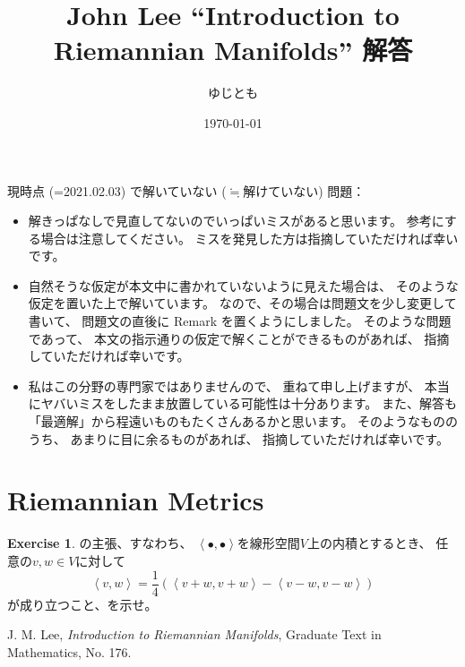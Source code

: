 \documentclass[uplatex,dvipdfmx]{jsarticle}
\title{John Lee ``Introduction to Riemannian Manifolds'' 解答}
\author{ゆじとも}
\date{\today}
\theoremstyle{definition}
\newtheorem{Ex}[Ex]{Exercise}
\begin{document}
\maketitle
\setcounter{subsection}{-1}


現時点 (=2021.02.03) で解いていない (\(\fallingdotseq\)解けていない) 問題：

\begin{itemize}
  \item
  解きっぱなしで見直してないのでいっぱいミスがあると思います。
  参考にする場合は注意してください。
  ミスを発見した方は指摘していただければ幸いです。
  \item
  自然そうな仮定が本文中に書かれていないように見えた場合は、
  そのような仮定を置いた上で解いています。
  なので、その場合は問題文を少し変更して書いて、
  問題文の直後に Remark を置くようにしました。
  そのような問題であって、
  本文の指示通りの仮定で解くことができるものがあれば、
  指摘していただければ幸いです。
  \item
  私はこの分野の専門家ではありませんので、
  重ねて申し上げますが、
  本当にヤバいミスをしたまま放置している可能性は十分あります。
  また、解答も「最適解」から程遠いものもたくさんあるかと思います。
  そのようなもののうち、
  あまりに目に余るものがあれば、
  指摘していただければ幸いです。
\end{itemize}

\newpage
\section{Riemannian Metrics}


\setcounter{Ex}{1}
\begin{Ex}\label{Ex: 2.2}
  \cite[Lemma 2.1]{JL}の主張、すなわち、
  \(\left<\bullet,\bullet\right>\)を線形空間\(V\)上の内積とするとき、
  任意の\(v,w\in V\)に対して
  \[
  \left< v,w \right> = \frac{1}{4}\left( \left<v+w,v+w\right>-\left<v-w,v-w\right>\right)
  \]
  が成り立つこと、を示せ。
\end{Ex}

\begin{thebibliography}{9}
  J. M. Lee,
  \textit{Introduction to Riemannian Manifolds},
  Graduate Text in Mathematics, No. 176.
\end{thebibliography}
\end{document}
